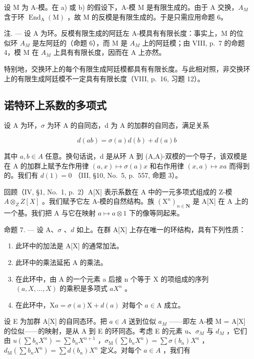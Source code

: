 设 M 为 A-模。在 a) 或 b) 的假设下，A-模 M 是有限生成的。由于 A 交换，\(A_{M}\) 含于环 \(\operatorname{End}_{\mathrm{A}}(\mathrm{M})\) ，故 M 的反模是有限生成的。于是只需应用命题 6。

注. --- 设 A 为环。反模有限生成的阿廷左 A-模具有有限长度：事实上，M 的位似环 \(A_{M}\) 是左阿廷的（命题 6），而 M 是 \(A_{M}\) 上的阿廷模；由 VIII, p.~7 的命题 4，模 M 在 \(A_{M}\) 上具有有限长度，因而在 A 上亦然。

特别地，交换环上的每个有限生成阿廷模都具有有限长度。与此相对照，非交换环上的有限生成阿廷模不一定具有有限长度（VIII, p.~16, 习题 12）。

\subsection{诺特环上系数的多项式}

设 A 为环，\(\sigma\) 为环 A 的自同态，d 为 A 的加群的自同态，满足关系

\[
d (a b) = \sigma (a) d (b) + d (a) b\tag{1}
\]

其中 \(a, b \in A\) 任意。换句话说，d 是从环 A 到 (A,A)-双模的一个导子，该双模是在 A 的加群上赋予左作用律 \((a, x) \mapsto \sigma(a)x\) 和右作用律 \((x, a) \mapsto xa\) 而得到的。我们有 \(d(1) = 0\) （III, §10, No.~5, p.~557, 命题 3）。

回顾（IV, §1, No.~1, p.~2）A{[}X{]} 表示系数在 A 中的一元多项式组成的 Z-模 \(A \otimes_{Z} Z[X]\) 。我们赋予它左 A-模的自然结构。族 \((\mathrm{X}^{n})_{n \in \mathbf{N}}\) 是 A{[}X{]} 在 A 上的一个基。我们把 A 与它在映射 \(a \mapsto a \otimes 1\) 下的像等同起来。

命题 7. --- 设 A、\(\sigma\) 、\(d\) 如上。在群 A{[}X{]} 上存在唯一的环结构，具有下列性质：

\begin{enumerate}
\def\labelenumi{\alph{enumi})}
\item
  此环中的加法是 A{[}X{]} 的通常加法。
\item
  此环中的乘法延拓 A 的乘法。
\item
  在此环中，由 A 的一个元素 a 后接 n 个等于 X 的项组成的序列 \((a,X,\ldots,X)\) 的乘积是多项式 \(aX^{n}\) 。
\item
  在此环中，\(\mathrm{X}a = \sigma(a)\mathrm{X} + d(a)\) 对每个 \(a \in \mathrm{A}\) 成立。
\end{enumerate}

设 E 为加群 A{[}X{]} 的自同态环。把 \(a \in A\) 送到位似 \(a_{M}\) ——即左 A-模 M = A{[}X{]} 的位似——的映射，是从 A 到 E 的环同态。考虑 E 的元素 u、\(\sigma_{M}\) 与 \(d_{M}\) ，它们由 \(u(\sum b_{n}X^{n}) = \sum b_{n}X^{n+1}\) ，\(\sigma_{\mathrm{M}}(\sum b_{n}X^{n}) = \sum \sigma(b_{n})X^{n}\) ，\(d_{\mathrm{M}}(\sum b_{n}X^{n}) = \sum d(b_{n})X^{n}\) 定义。对每个 \(a \in A\) ，我们有

